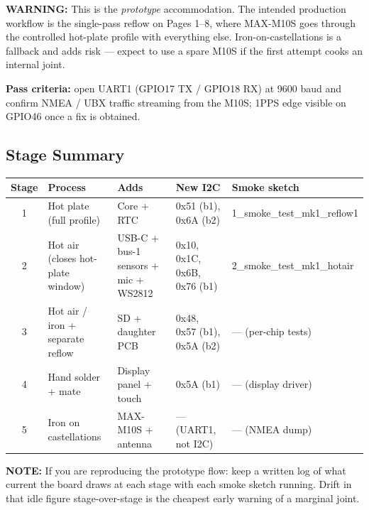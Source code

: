 \documentclass[11pt,a4paper]{article}
\newcommand{\dangerbox}[1]{\par\noindent\colorbox{danger!10}{\parbox{\dimexpr\textwidth-2\fboxsep}{%
\textcolor{danger}{\textbf{WARNING:}} #1}}\par\vspace{0.5em}}
\newcommand{\notebox}[1]{\par\noindent\colorbox{headerblue!8}{\parbox{\dimexpr\textwidth-2\fboxsep}{%
\textcolor{headerblue}{\textbf{NOTE:}} #1}}\par\vspace{0.5em}}
\begin{document}
\dangerbox{This is the \emph{prototype} accommodation. The intended production workflow is the single-pass reflow on Pages 1--8, where MAX-M10S goes through the controlled hot-plate profile with everything else. Iron-on-castellations is a fallback and adds risk --- expect to use a spare M10S if the first attempt cooks an internal joint.}

\textbf{Pass criteria:} open UART1 (GPIO17 TX / GPIO18 RX) at 9600 baud and confirm NMEA / UBX traffic streaming from the M10S; 1PPS edge visible on GPIO46 once a fix is obtained.

\subsection*{Stage Summary}

{\small
\begin{table}[H]
\centering
\renewcommand{\arraystretch}{1.2}
\begin{tabular}{@{}cp{3.2cm}p{4.0cm}p{3.4cm}p{3.4cm}@{}}
\toprule
\textbf{Stage} & \textbf{Process} & \textbf{Adds} & \textbf{New I2C} & \textbf{Smoke sketch} \\
\midrule
1 & Hot plate (full profile)          & Core + RTC                                 & 0x51 (b1), 0x6A (b2)         & 1\_smoke\_test\_mk1\_reflow1 \\
2 & Hot air (closes hot-plate window) & USB-C + bus-1 sensors + mic + WS2812       & 0x10, 0x1C, 0x6B, 0x76 (b1)  & 2\_smoke\_test\_mk1\_hotair  \\
3 & Hot air / iron + separate reflow  & SD + daughter PCB                          & 0x48, 0x57 (b1), 0x5A (b2)   & --- (per-chip tests) \\
4 & Hand solder + mate                & Display panel + touch                      & 0x5A (b1)                    & --- (display driver) \\
5 & Iron on castellations             & MAX-M10S + antenna                         & --- (UART1, not I2C)         & --- (NMEA dump) \\
\bottomrule
\end{tabular}
\end{table}
}

\notebox{If you are reproducing the prototype flow: keep a written log of what current the board draws at each stage with each smoke sketch running. Drift in that idle figure stage-over-stage is the cheapest early warning of a marginal joint.}
\end{document}
